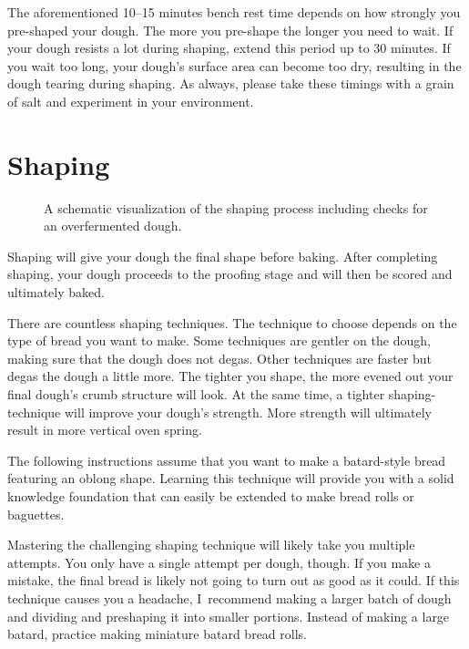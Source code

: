 The aforementioned 10--15 minutes bench rest time depends
on how strongly you pre-shaped your dough. The more
you pre-shape the longer you need to wait. If your dough
resists a lot during shaping, extend this period up to 30 minutes.
If you wait too long, your dough's surface area can become too dry,
resulting in the dough tearing during shaping. As always, please
take these timings with a grain of salt and experiment in
your environment.

\section{Shaping}

\begin{figure}[!htb]
\begin{center}
  
  \caption{A schematic visualization of the shaping process including checks
  for an overfermented dough.}%
  \label{fig:shaping-decision-tree}
\end{center}
\end{figure}

Shaping will give your dough the final shape before baking. After
completing shaping, your dough proceeds to the proofing stage and
will then be scored and ultimately baked.

There are countless shaping techniques. The technique to choose
depends on the type of bread you want to make. Some techniques
are gentler on the dough, making sure that the dough does not
degas. Other techniques are faster but degas the dough a little
more. The tighter you shape, the more evened out your final dough's
crumb structure will look. At the same time, a tighter shaping-technique
will improve your dough's strength. More strength will ultimately result
in more vertical oven spring.

The following instructions assume that you want to make a batard-style
bread featuring an oblong shape. Learning this technique
will provide you with a solid knowledge foundation that
can easily be extended to make bread rolls or baguettes.

Mastering the challenging shaping technique will likely take you
multiple attempts. You only have a single attempt per dough, though. If you
make a mistake, the final bread is likely not going to turn out as good
as it could. If this technique causes you a headache, I~recommend making
a larger batch of dough and dividing and preshaping it into
smaller portions. Instead of making a large batard, practice making miniature
batard bread rolls.

